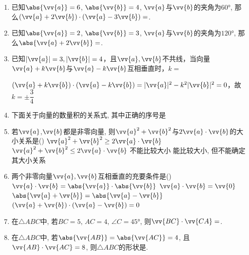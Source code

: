 \begin{enumerate}
    
    \item 已知$\abs{\vv{a}}=6$, $\abs{\vv{b}}=4$, $\vv{a}$与$\vv{b}$的夹角为$\ang{60}$, 那么$(\vv{a}+2\vv{b})\cdot(\vv{a}-3\vv{b})=$.
    \item 已知$\abs{\vv{a}}=2$, $\abs{\vv{b}}=3$, $\vv{a}$与$\vv{b}$的夹角为$\ang{120}$, 那么$\abs{\vv{a}+2\vv{b}}=$. 
    \item 已知$|\vv{a}| = 3, |\vv{b}| = 4$，且$\vv{a}, \vv{b}$不共线，当向量$\vv{a} + k \vv{b}$与$\vv{a} - k \vv{b}$互相垂直时，$k = $
    \begin{jieda}
        $(\vv{a} + k \vv{b}) \cdot (\vv{a} - k \vv{b}) = |\vv{a}|^2 - k^2 |\vv{b}|^2 = 0$，故$k = \pm \dfrac{3}{4}$
    \end{jieda}
    \item 下面关于向量的数量积的关系式, 其中正确的序号是
    
    
    \item 若$\vv{a}$,$\vv{b}$都是非零向量, 则$\vv{a}^{2}+\vv{b}^{2}$与$2\vv{a}\cdot\vv{b}$的大小关系是\dotfill()
    \xx
    {$\vv{a}^{2}+\vv{b}^{2}\geq2\vv{a}\cdot\vv{b}$}
    {$\vv{a}^{2}+\vv{b}^{2}\leq2\vv{a}\cdot\vv{b}$}
    {不能比较大小}
    {能比较大小, 但不能确定其大小关系}
    
    \item 两个非零向量$\vv{a},\vv{b}$互相垂直的充要条件是\dotfill()
    \xx
    {$\vv{a}\cdot\vv{b}=\abs{\vv{a}}\cdot\abs{\vv{b}}$}
    {$\vv{a}\cdot\vv{b}=\vv{0}$}
    {$\abs{\vv{a}+\vv{b}}=\abs{\vv{a}-\vv{b}}$}
    {$(\vv{a}+\vv{b})\cdot(\vv{a}-\vv{b})=0$}
    
    \item 在$\triangle{ABC}$中, 若$BC=5$, $AC=4$, $\angle{C}=\ang{45}$, 则$\vv{BC}\cdot\vv{CA}=$. 
    
    \item 在$\triangle{ABC}$中, 若$\abs{\vv{AB}}=\abs{\vv{AC}}=4$, 且$\vv{AB}\cdot\vv{AC}=8$, 则$\triangle{ABC}$的形状是. 
    

\end{enumerate}
